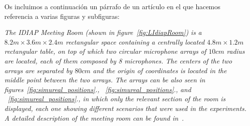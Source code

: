\documentclass[spanish,openright]{book}
\begin{document}
Os incluimos a continuación un
párrafo de un artículo en el que hacemos referencia a varias figuras y
subfiguras:

\emph{The IDIAP Meeting Room (shown in figure~\ref{fig:LIdiapRoom}) is a $8.2m
\times 3.6m \times 2.4m$ rectangular space containing a centrally
located $4.8m \times 1.2m$ rectangular table, on top of which two
circular microphone arrays of $10 cm$ radius are located, each of them
composed by 8 microphones. The centers of the two arrays are separated
by $80 cm$ and the origin of coordinates is located in the middle point
between the two arrays. The arrays can be also seen in
figures~\ref{fig:simureal_positions}.,
~\ref{fig:simureal_positions}., and
~\ref{fig:simureal_positions}., in which
only the relevant section of the room is displayed, each one showing
different scenarios that were used in the experiments. A detailed
description of the meeting room can be found in~\cite{moore2002}.}
\end{document}
